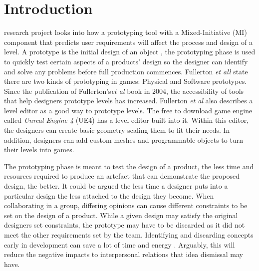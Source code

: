 \documentclass[journal]{IEEEtran}
\begin{document}
\section{Introduction} \label{intro}
 research project looks into how a prototyping tool with a Mixed-Initiative (MI) component that predicts user requirements will affect the process and design of a level. A prototype is the initial design of an object \cite{prototype}, the prototyping phase is used to quickly test certain aspects of a products' design so the designer can identify and solve any problems before full production commences\cite{budde1992prototyping}. Fullerton \textit{et all} \cite[p.~150]{fullerton2004game} state there are two kinds of prototyping in games: Physical and Software prototypes. Since the publication of Fullerton's\textit{et al}\cite{fullerton2004game} book in 2004, the accessibility of tools that help designers prototype levels has increased. Fullerton \textit{et al} \cite[p.~164]{fullerton2004game} also describes a level editor as a good way to prototype levels. The free to download game engine called \textit{Unreal Engine 4} (UE4) has a level editor built into it. Within this editor, the designers can create basic geometry scaling them to fit their needs. In addition, designers can add custom meshes and programmable objects to turn their levels into games.

The prototyping phase is meant to test the design of a product, the less time and resources required to produce an artefact that can demonstrate the proposed design, the better. It could be argued the less time a designer puts into a particular design the less attached to the design they become. When collaborating in a group, differing opinions can cause different constraints to be set on the design of a product. While a given design may satisfy the original designers set constraints, the prototype may have to be discarded as it did not meet the other requirements set by the team. Identifying and discarding concepts early in development can save a lot of time and energy \cite[p.489]{stempfle1999thinking}. Arguably, this will reduce the negative impacts to interpersonal relations that idea dismissal may have.
\end{document}
